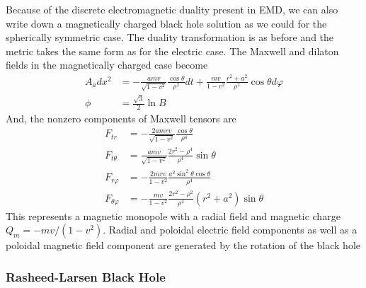 \documentclass[%
 reprint,
 amsmath,amssymb,
 aps,
]{revtex4-1}
\begin{document}
Because of the discrete electromagnetic duality present in EMD, we can also write down a magnetically charged black hole solution as we could for the spherically symmetric case. The duality transformation is as before and the metric takes the same form as for the electric case. The Maxwell and dilaton fields in the magnetically charged case become
\begin{align}
A_a dx^2 &= -\frac{amv}{\sqrt{1-v^2}} \frac{\cos \theta}{\rho^2} dt + \frac{mv}{1-v^2} \frac{r^2 + a^2}{\rho^2} \cos \theta d \varphi \\
\phi &= \frac{\sqrt{3}}{2} \ln B
\end{align}
And, the nonzero components of Maxwell tensors are
\begin{align}
F_{tr} &= -\frac{2amrv}{\sqrt{1-v^2}} \frac{\cos \theta}{\rho^4} \\
F_{t \theta} &= \frac{amv}{\sqrt{1-v^2}} \frac{2r^2 - \rho^4}{\rho^4} \sin \theta \\
F_{r \varphi} &= - \frac{2mrv}{1-v^2} \frac{a^2 \sin^2 \theta \cos \theta}{\rho^4} \\
F_{\theta \varphi} &= - \frac{mv}{1-v^2} \frac{2r^2 -\rho^2}{\rho^4} (r^2 + a^2) \sin \theta
\end{align}
This represents a magnetic monopole with a radial field and magnetic charge $Q_m = -mv/(1-v^2)$. Radial and poloidal electric field components as well as a poloidal magnetic field component are generated by the rotation of the black hole

\subsubsection{Rasheed-Larsen Black Hole}
\end{document}
